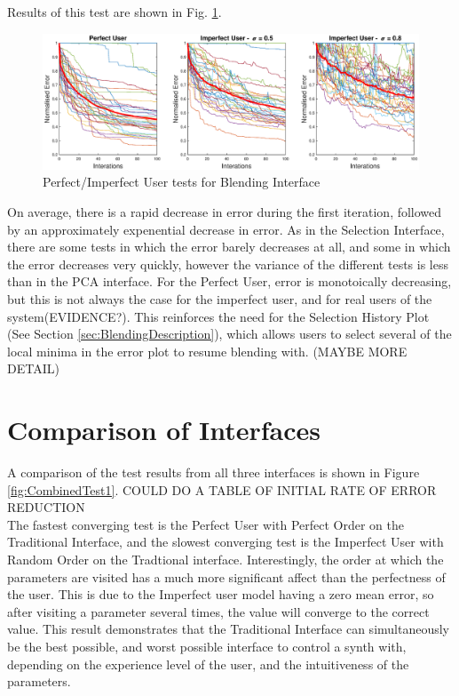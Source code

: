 \documentclass[11pt, oneside]{report}   	%
\begin{document}
Results of this test are shown in Fig. \ref{fig:BlendingTest1}.
\begin{figure}
	\hspace{-70pt}
	\includegraphics[width = 8in]{BlendingInterfaceTests1.eps}
	\caption{Perfect/Imperfect User tests for Blending Interface}
	\label{fig:BlendingTest1}
\end{figure}
On average, there is a rapid decrease in error during the first iteration, followed by an approximately expenential decrease in error.
As in the Selection Interface, there are some tests in which the error barely decreases at all, and some in which the error decreases very quickly, however the variance of the different tests is less than in the PCA interface. For the Perfect User, error is monotoically decreasing, but this is not always the case for the imperfect user, and for real users of the system(EVIDENCE?). This reinforces the need for the Selection History Plot (See Section \ref{sec:BlendingDescription}), which allows users to select several of the local minima in the error plot to resume blending with. (MAYBE MORE DETAIL)

\section{Comparison of Interfaces}
A comparison of the test results from all three interfaces is shown in Figure \ref{fig:CombinedTest1}.  COULD DO A TABLE OF INITIAL RATE OF ERROR REDUCTION
\\
The fastest converging test is the Perfect User with Perfect Order on the Traditional Interface, and the slowest converging test is the Imperfect User with Random Order on the Tradtional interface. Interestingly, the order at which the parameters are visited has a much more significant affect than the perfectness of the user. This is due to the Imperfect user model having a zero mean error, so after visiting a parameter several times, the value will converge to the correct value. This result demonstrates that the Traditional Interface can simultaneously be the best possible, and worst possible interface to control a synth with, depending on the experience level of the user, and the intuitiveness of the parameters.
\end{document}
